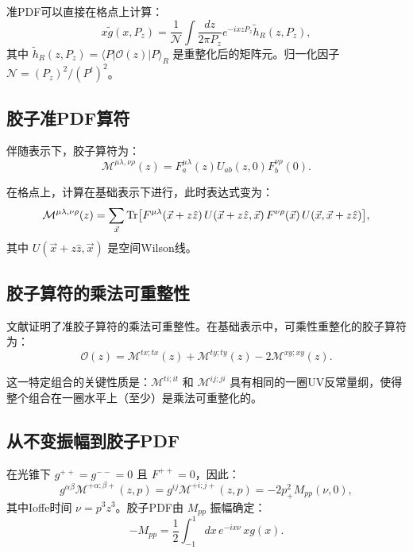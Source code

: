 \documentclass[11pt,a4paper]{article}
\newcommand{\Tr}{\text{Tr}}
\newcommand{\hR}{\tilde{h}_R}
\newcommand{\Pz}{P_z}
\begin{document}
准PDF可以直接在格点上计算：
\begin{equation}\label{eq:quasi-pdf}
    x\tilde{g}(x, \Pz) = \frac{1}{\mathcal{N}} \int \frac{dz}{2\pi\Pz} e^{-ixz\Pz} \hR(z, \Pz),
\end{equation}
其中 $\hR(z, \Pz) = \langle P | \mathcal{O}(z) | P \rangle_R$ 是重整化后的矩阵元。归一化因子 $\mathcal{N} = (\Pz)^2/(P^t)^2$。

\subsection{胶子准PDF算符}

伴随表示下，胶子算符为：
\begin{equation}\label{eq:M_adj}
    \mathcal{M}^{\mu\lambda,\nu\rho}(z) = F^{\mu\lambda}_a(z) U_{ab}(z,0) F^{\nu\rho}_b(0).
\end{equation}

在格点上，计算在基础表示下进行，此时表达式变为：
\begin{equation}\label{eq:M_fund}
    \mathcal{M}^{\mu\lambda,\nu\rho}(z) = \sum_{\vec{x}} \Tr\qty[F^{\mu\lambda}(\vec{x}+z\hat{z}) \, U(\vec{x}+z\hat{z}, \vec{x}) \, F^{\nu\rho}(\vec{x}) \, U(\vec{x}, \vec{x}+z\hat{z})],
\end{equation}
其中 $U(\vec{x}+z\hat{z}, \vec{x})$ 是空间Wilson线。

\subsection{胶子算符的乘法可重整性}

文献\cite{Li:2018uif}证明了准胶子算符的乘法可重整性。在基础表示中，可乘性重整化的胶子算符为\cite{Zhang:2018diw,Balitsky:2019krj}：
\begin{equation}\label{eq:O_mult}
    \mathcal{O}(z) = \mathcal{M}^{tx;tx}(z) + \mathcal{M}^{ty;ty}(z) - 2\mathcal{M}^{xy;xy}(z).
\end{equation}

这一特定组合的关键性质是：$\mathcal{M}^{ti;it}$ 和 $\mathcal{M}^{ij;ji}$ 具有相同的一圈UV反常量纲，使得整个组合在一圈水平上（至少）是乘法可重整化的。

\subsection{从不变振幅到胶子PDF}

在光锥下 $g^{++} = g^{--} = 0$ 且 $F^{++} = 0$，因此：
\begin{equation}
    g^{\alpha\beta} \mathcal{M}^{+\alpha;\beta+}(z,p) = g^{ij} \mathcal{M}^{+i;j+}(z,p) = -2p^2_+ M_{pp}(\nu, 0),
\end{equation}
其中Ioffe时间 $\nu = p^3 z^3$。胶子PDF由 $M_{pp}$ 振幅确定：
\begin{equation}\label{eq:Mpp_PDF}
    -M_{pp} = \frac{1}{2} \int_{-1}^{1} dx \, e^{-ix\nu} \, x g(x).
\end{equation}
\end{document}
